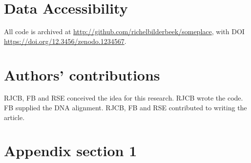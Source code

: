 \documentclass{article}
\begin{document}
\section{Data Accessibility}

All code is archived at \url{http://github.com/richelbilderbeek/someplace},
with DOI \url{https://doi.org/12.3456/zenodo.1234567}.

\section{Authors' contributions}

RJCB, FB and RSE conceived the idea for this research. 
RJCB wrote the code.
FB supplied the DNA alignment.
RJCB, FB and RSE contributed to writing the article.




\appendix

\section{Appendix section 1}
\end{document}
